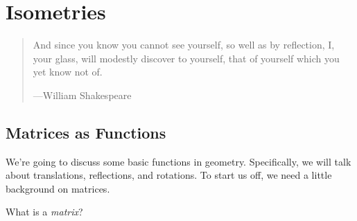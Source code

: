 \chapter{Isometries}

\begin{quote}
And since you know you cannot see yourself, so well as by reflection,
I, your glass, will modestly discover to yourself, that of yourself
which you yet know not of.

\hfill---William Shakespeare
\end{quote}




\section{Matrices as Functions}

We're going to discuss some basic functions in geometry.
Specifically, we will talk about translations, reflections, and
rotations. To start us off, we need a little background on
matrices.

\begin{question} 
What is a \textit{matrix}?
\end{question}


